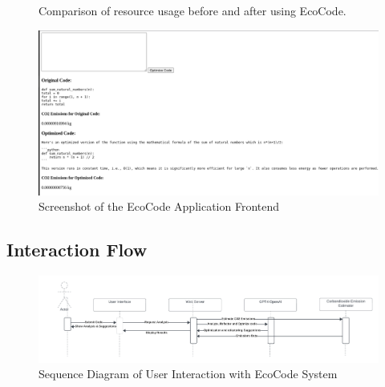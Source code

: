 \documentclass[conference,compsoc]{IEEEtran}
\begin{document}
\begin{figure}[H]
	\centering
	\caption{Comparison of resource usage before and after using EcoCode.}
	\label{fig:resource_usage}
\end{figure}


\begin{figure}[H]
	\centering
	\includegraphics[width=\linewidth]{figures/Frontend.png}
	\caption{Screenshot of the EcoCode Application Frontend}
	\label{fig:frontend_screenshot}
\end{figure}

\subsection{Interaction Flow}
\begin{figure}[H]
	\centering
	\includegraphics[width=\linewidth]{figures/Sequence Diagram.png}
	\caption{Sequence Diagram of User Interaction with EcoCode System}
	\label{fig:sequence_diagram}
\end{figure}
\end{document}

